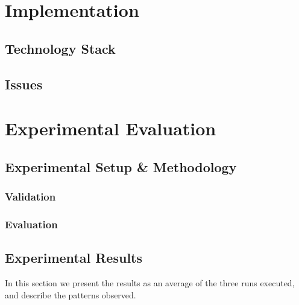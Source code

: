 \documentclass[10pt,journal,compsoc]{IEEEtran}
\begin{document}

	\section{Implementation}
	\subsection{Technology Stack}
	\subsection{Issues}

	
	\section{Experimental Evaluation}
	\subsection{Experimental Setup \& Methodology}
	\subsubsection{Validation}
	\subsubsection{Evaluation}
	\subsection{Experimental Results}
	
	In this section we present the results as an average of the three runs executed, and describe the patterns observed.
	
	
\end{document}
